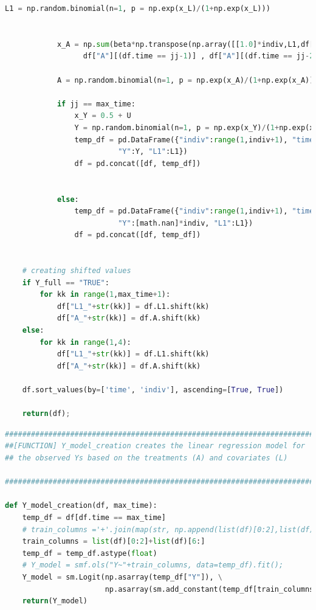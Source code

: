 \begin{lstlisting}[language=Python]
            L1 = np.random.binomial(n=1, p = np.exp(x_L)/(1+np.exp(x_L)))


            x_A = np.sum(beta*np.transpose(np.array([[1.0]*indiv,L1,df["L1"][(df.time == jj-1)],\
                  df["A"][(df.time == jj-1)] , df["A"][(df.time == jj-2)]])), axis = 1)

            A = np.random.binomial(n=1, p = np.exp(x_A)/(1+np.exp(x_A)))

            if jj == max_time: 
                x_Y = 0.5 + U 
                Y = np.random.binomial(n=1, p = np.exp(x_Y)/(1+np.exp(x_Y)))                
                temp_df = pd.DataFrame({"indiv":range(1,indiv+1), "time":jj,"U":U, "A":A, \
                          "Y":Y, "L1":L1})
                df = pd.concat([df, temp_df])


            else: 
                temp_df = pd.DataFrame({"indiv":range(1,indiv+1), "time":jj,"U":U, "A":A, \
                          "Y":[math.nan]*indiv, "L1":L1})
                df = pd.concat([df, temp_df])


    # creating shifted values 
    if Y_full == "TRUE":
        for kk in range(1,max_time+1):
            df["L1_"+str(kk)] = df.L1.shift(kk)
            df["A_"+str(kk)] = df.A.shift(kk)
    else:
        for kk in range(1,4):
            df["L1_"+str(kk)] = df.L1.shift(kk)
            df["A_"+str(kk)] = df.A.shift(kk)
            
    df.sort_values(by=['time', 'indiv'], ascending=[True, True])

    return(df); 
\end{lstlisting}

\begin{lstlisting}[language=Python]
#########################################################################
##[FUNCTION] Y_model_creation creates the linear regression model for 
## the observed Ys based on the treatments (A) and covariates (L)  

#########################################################################

def Y_model_creation(df, max_time): 
    temp_df = df[df.time == max_time]
    # train_columns ='+'.join(map(str, np.append(list(df)[0:2],list(df)[6:])))
    train_columns = list(df)[0:2]+list(df)[6:]
    temp_df = temp_df.astype(float)
    # Y_model = smf.ols("Y~"+train_columns, data=temp_df).fit(); 
    Y_model = sm.Logit(np.asarray(temp_df["Y"]), \
                       np.asarray(sm.add_constant(temp_df[train_columns]))).fit(); 
    return(Y_model)
\end{lstlisting}

